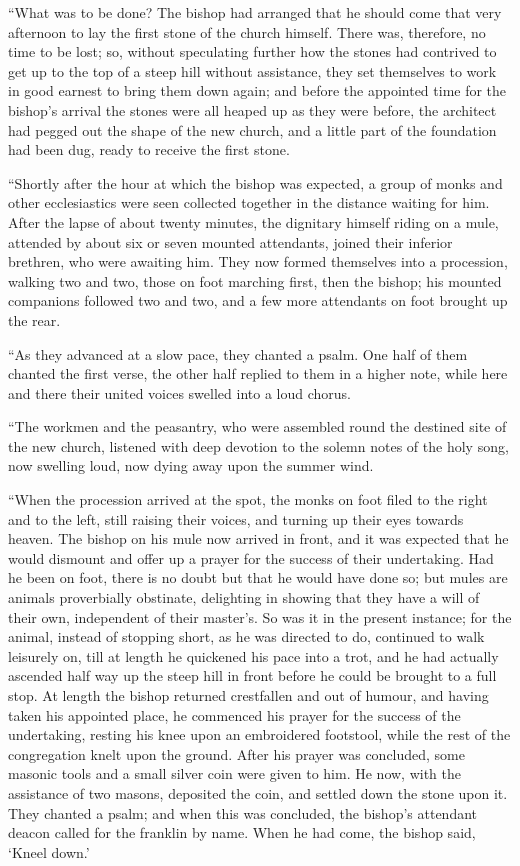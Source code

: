 \documentclass[
  12pt,
  a5paper,
  twoside]{book}
\begin{document}
``What was to be done? The bishop had arranged that he should come that
very afternoon to lay the first stone of the church himself. There was,
therefore, no time to be lost; so, without speculating further how the
stones had contrived to get up to the top of a steep hill without
assistance, they set themselves to work in good earnest to bring them
down again; and before the appointed time for the bishop's arrival the
stones were all heaped up as they were before, the architect had pegged
out the shape of the new church, and a little part of the foundation had
been dug, ready to receive the first stone.

``Shortly after the hour at which the bishop was expected, a group of
monks and other ecclesiastics were seen collected together in the
distance waiting for him. After the lapse of about twenty minutes, the
dignitary himself riding on a mule, attended by about six or seven
mounted attendants, joined their inferior brethren, who were awaiting
him. They now formed themselves into a procession, walking two and two,
those on foot marching first, then the bishop; his mounted companions
followed two and two, and a few more attendants on foot brought up the
rear.

``As they advanced at a slow pace, they chanted a psalm. One half of
them chanted the first verse, the other half replied to them in a higher
note, while here and there their united voices swelled into a loud
chorus.

``The workmen and the peasantry, who were assembled round the destined
site of the new church, listened with deep devotion to the solemn notes
of the holy song, now swelling loud, now dying away upon the summer
wind.

``When the procession arrived at the spot, the monks on foot filed to
the right and to the left, still raising their voices, and turning up
their eyes towards heaven. The bishop on his mule now arrived in front,
and it was expected that he would dismount and offer up a prayer for the
success of their undertaking. Had he been on foot, there is no doubt but
that he would have done so; but mules are animals proverbially
obstinate, delighting in showing that they have a will of their own,
independent of their master's. So was it in the present instance; for
the animal, instead of stopping short, as he was directed to do,
continued to walk leisurely on, till at length he quickened his pace
into a trot, and he had actually ascended half way up the steep hill in
front before he could be brought to a full stop. At length the bishop
returned crestfallen and out of humour, and having taken his appointed
place, he commenced his prayer for the success of the undertaking,
resting his knee upon an embroidered footstool, while the rest of the
congregation knelt upon the ground. After his prayer was concluded, some
masonic tools and a small silver coin were given to him. He now, with
the assistance of two masons, deposited the coin, and settled down the
stone upon it. They chanted a psalm; and when this was concluded, the
bishop's attendant deacon called for the franklin by name. When he had
come, the bishop said, `Kneel down.'
\end{document}
